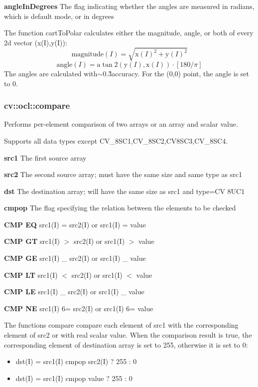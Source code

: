 \documentclass{article}
\begin{document}
\textbf{angleInDegrees }The flag indicating whether the angles are measured
in radians, which is default mode, or in degrees

The function cartToPolar calculates either the magnitude, angle, or both of
every 2d vector (x(I),y(I)):
\[
\mbox{magnitude}(I)=\sqrt {\mbox{x}(I)^2+\mbox{y}(I)^2}
\]
\[
\mbox{angle}(I)=\mbox{a}\tan 2(\mbox{y}(I),\mbox{x}(I))\cdot [180/\pi ]
\]
The angles are calculated with$\sim $0.3\r{ }accuracy. For the (0,0) point,
the angle is set to 0.

\newpage

\subsubsection{cv::ocl::compare}
\label{subsubsec:mylabel11}
Performs per-element comparison of two arrays or an array and scalar value.

Supports all data types except CV{\_}8SC1,CV{\_}8SC2,CV8SC3,CV{\_}8SC4.

\textbf{src1 }The first source array

\textbf{src2 }The second source array; must have the same size and same type
as src1

\textbf{dst }The destination array; will have the same size as src1 and
type=CV 8UC1

\textbf{cmpop }The flag specifying the relation between the elements to be
checked

\textbf{CMP EQ }src1(I) = src2(I) or src1(I) = value

\textbf{CMP GT }src1(I) $>$ src2(I) or src1(I) $>$ value

\textbf{CMP GE }src1(I) {\_} src2(I) or src1(I) {\_} value

\textbf{CMP LT }src1(I) $<$ src2(I) or src1(I) $<$ value

\textbf{CMP LE }src1(I) {\_} src2(I) or src1(I) {\_} value

\textbf{CMP NE }src1(I) 6= src2(I) or src1(I) 6= value

The functions compare compare each element of src1 with the corresponding
element of src2 or with real scalar value. When the comparison result is
true, the corresponding element of destination array is set to 255,
otherwise it is set to 0:

\begin{itemize}
\item dst(I) = src1(I) cmpop src2(I) ? 255 : 0
\item dst(I) = src1(I) cmpop value ? 255 : 0
\end{itemize}
\end{document}
